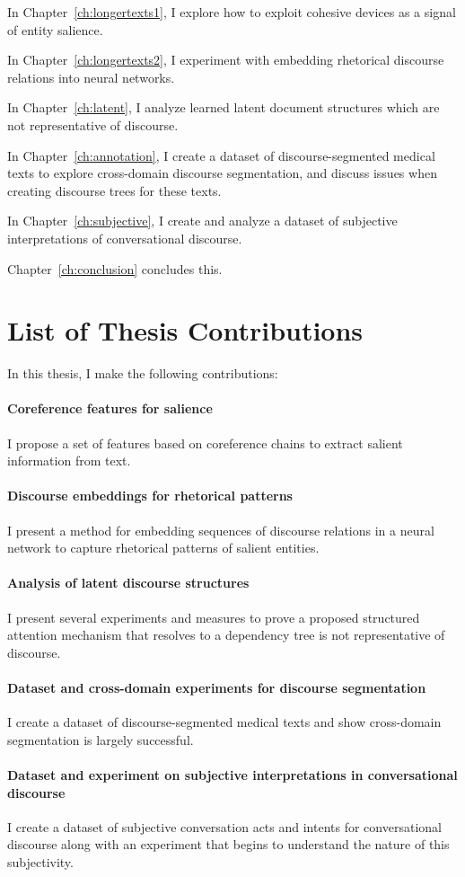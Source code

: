 In Chapter~\ref{ch:longertexts1}, I explore how to exploit cohesive devices as a signal of entity salience.

In Chapter~\ref{ch:longertexts2}, I experiment with embedding rhetorical discourse relations into neural networks.

In Chapter~\ref{ch:latent}, I analyze learned latent document structures which are not representative of discourse.

In Chapter~\ref{ch:annotation}, I create a dataset of discourse-segmented medical texts to explore cross-domain discourse segmentation, and discuss issues when creating discourse trees for these texts.

In Chapter~\ref{ch:subjective}, I create and analyze a dataset of subjective interpretations of conversational discourse.

Chapter~\ref{ch:conclusion} concludes this.


\section{List of Thesis Contributions}

\noindent In this thesis, I make the following contributions:

\paragraph{Coreference features for salience}
I propose a set of features based on coreference chains to extract salient information from text.

\paragraph{Discourse embeddings for rhetorical patterns}
I present a method for embedding sequences of discourse relations in a neural network to capture rhetorical patterns of salient entities.

\paragraph{Analysis of latent discourse structures}
I present several experiments and measures to prove a proposed structured attention mechanism that resolves to a dependency tree is not representative of discourse.

\paragraph{Dataset and cross-domain experiments for discourse segmentation}
I create a dataset of discourse-segmented medical texts and show cross-domain segmentation is largely successful.

\paragraph{Dataset and experiment on subjective interpretations in conversational discourse}
I create a dataset of subjective conversation acts and intents for conversational discourse along with an experiment that begins to understand the nature of this subjectivity.